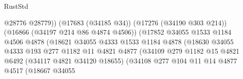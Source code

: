 \begin{lexlean}{RustStd}
\begin{coremodule}
                                                    @28776
                                                    @28779))
                                                (@17683 (@34185 @34))
                                                (@17276 (@34190 @303 @214))
                                                (@16866 (@34197 @214 @86 @4874 @4506))
                                                (@17852
                                                  @34055
                                                  @1533
                                                  @1184
                                                  @4506
                                                  @4878
                                                  (@18621
                                                    @34055
                                                    @4333
                                                    @1533
                                                    @1184
                                                    @4878
                                                    (@18630
                                                      @34055
                                                      @4333
                                                      @193
                                                      @277
                                                      @1182
                                                      @11
                                                      @4821
                                                      @4877
                                                      (@34109
                                                        @279
                                                        @1182
                                                        @15
                                                        @4821
                                                        @6492
                                                        (@34117 @4821 @34120 @18655)
                                                        (@34108
                                                          @277
                                                          @104
                                                          @11
                                                          @14
                                                          @4877
                                                          @4517
                                                          (@18667
                                                            @34055

\end{coremodule}
\end{lexlean}
